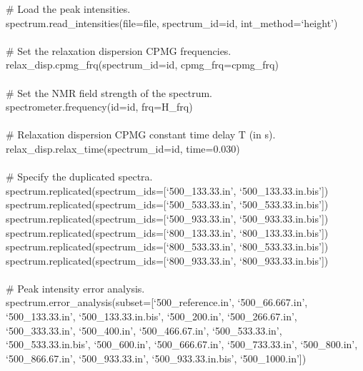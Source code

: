 \begin{exampleenv}
\hspace*{4ex} \# Load the peak intensities. \\
\hspace*{4ex} spectrum.read\_intensities(file=file, spectrum\_id=id, int\_method=`height') \\
 \\
\hspace*{4ex} \# Set the relaxation dispersion CPMG frequencies. \\
\hspace*{4ex} relax\_disp.cpmg\_frq(spectrum\_id=id, cpmg\_frq=cpmg\_frq) \\
 \\
\hspace*{4ex} \# Set the NMR field strength of the spectrum. \\
\hspace*{4ex} spectrometer.frequency(id=id, frq=H\_frq) \\
 \\
\hspace*{4ex} \# Relaxation dispersion CPMG constant time delay T (in s). \\
\hspace*{4ex} relax\_disp.relax\_time(spectrum\_id=id, time=0.030) \\
 \\
\# Specify the duplicated spectra. \\
spectrum.replicated(spectrum\_ids=[`500\_133.33.in', `500\_133.33.in.bis']) \\
spectrum.replicated(spectrum\_ids=[`500\_533.33.in', `500\_533.33.in.bis']) \\
spectrum.replicated(spectrum\_ids=[`500\_933.33.in', `500\_933.33.in.bis']) \\
spectrum.replicated(spectrum\_ids=[`800\_133.33.in', `800\_133.33.in.bis']) \\
spectrum.replicated(spectrum\_ids=[`800\_533.33.in', `800\_533.33.in.bis']) \\
spectrum.replicated(spectrum\_ids=[`800\_933.33.in', `800\_933.33.in.bis']) \\
 \\
\# Peak intensity error analysis. \\
spectrum.error\_analysis(subset=[`500\_reference.in', `500\_66.667.in', `500\_133.33.in', `500\_133.33\linebreak[0]{}.in.bis', `500\_200.in', `500\_266.67.in', `500\_333.33.in', `500\_400.in', `500\_466.67.in', `500\_533\linebreak[0]{}.33.in', `500\_533.33.in.bis', `500\_600.in', `500\_666.67.in', `500\_733.33.in', `500\_800.in', `500\linebreak[0]{}\_866.67.in', `500\_933.33.in', `500\_933.33.in.bis', `500\_1000.in']) \\

\end{exampleenv}
